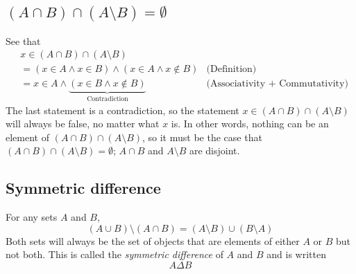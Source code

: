 \documentclass{report}
\theoremstyle{definition}
\begin{document}
\subsection{$(A\cap B)\cap(A\setminus B)=\emptyset$}
See that
\begin{align*}
&x\in(A\cap B)\cap(A\setminus B)&\\
&=(x\in A\land x\in B)\land(x\in A\land x\notin B)&\text{(Definition)}\\
&=x\in A\land\underbrace{(x\in B\land x\notin B)}_{\text{Contradiction}}&\text{(Associativity + Commutativity)}
\end{align*}
The last statement is a contradiction, so the statement 
$x\in(A\cap B)\cap(A\setminus B)$ will always be false, no matter what $x$ is. In other words, nothing can be an element of 
$(A\cap B)\cap(A\setminus B)$, so it must be the case that 
$(A\cap B)\cap(A\setminus B)=\emptyset$; $A\cap B$ and $A\setminus B$ are disjoint.
\newpage

\subsection{Symmetric difference}
For any sets $A$ and $B$, 
\begin{equation*}
(A\cup B)\setminus(A\cap B)=(A\setminus B)\cup(B\setminus A)
\end{equation*}
Both sets will always be the set of objects that are elements of either $A$ or $B$ but not both. This is called the \textit{symmetric
difference} of $A$ and $B$ and is written
\begin{equation*}
A\Delta B
\end{equation*}
\end{document}
